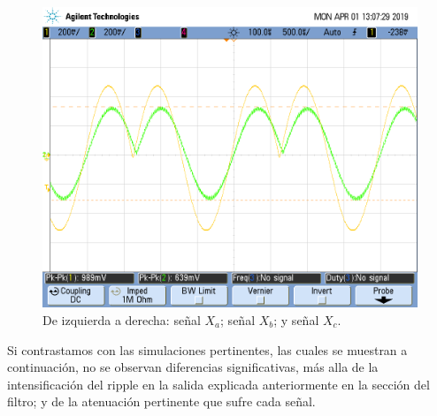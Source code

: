 \documentclass[../../ASSD_TP1_G7.tex]{subfiles}
\begin{document}
\begin{figure}[H]
\centering{}\includegraphics[scale=0.25]{Imagenes/ej_6_b_}\caption{De izquierda a derecha: señal $X_{a}$; señal $X_{b}$; y señal $X_{c}$.}
\end{figure}

Si contrastamos con las simulaciones pertinentes, las cuales se muestran
a continuación, no se observan diferencias significativas, más alla
de la intensificación del ripple en la salida explicada anteriormente en la sección del filtro; y de la atenuación
pertinente que sufre cada señal.
\end{document}
